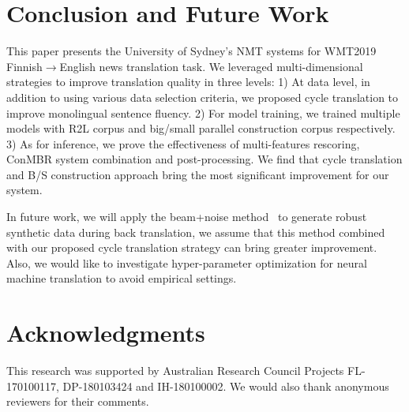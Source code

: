 \documentclass[11pt,a4paper]{article}
\begin{document}
\section{Conclusion and Future Work}
\label{sec:con}
This paper presents the University of Sydney's NMT systems for WMT2019 Finnish$\rightarrow$English news translation task. We leveraged multi-dimensional strategies to improve translation quality in three levels: 1) At data level, in addition to using various data selection criteria, we proposed cycle translation to improve monolingual sentence fluency. 2) For model training, we trained multiple models with R2L corpus and big/small parallel construction corpus respectively. 3) As for inference, we prove the effectiveness of multi-features rescoring, ConMBR system combination and post-processing. We find that cycle translation and B/S construction approach bring the most significant improvement for our system.

In future work, we will apply the beam+noise method~\cite{edunov2018understanding} to generate robust synthetic data during back translation, we assume that this method combined with our proposed cycle translation strategy can bring greater improvement. Also, we would like to investigate hyper-parameter optimization for neural machine translation to avoid empirical settings.

\section*{Acknowledgments}

This research was supported by Australian Research Council Projects FL-170100117, DP-180103424 and IH-180100002. We would also thank anonymous reviewers for their comments.



\end{document}
